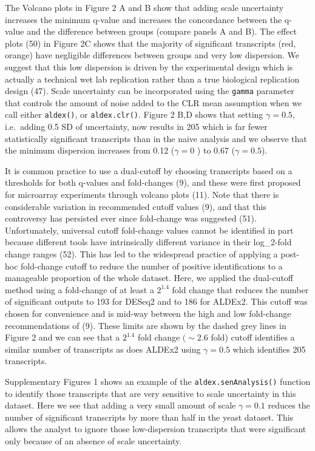 \documentclass[
]{article}
\begin{document}
The Volcano plots in Figure 2 A and B show that adding scale uncertainty
increases the minimum q-value and increases the concordance between the
q-value and the difference between groups (compare panels A and B). The
effect plots (50) in Figure 2C shows that the majority of significant
transcripts (red, orange) have negligible differences between groups and
very low dispersion. We suggest that this low dispersion is driven by
the experimental design which is actually a technical wet lab
replication rather than a true biological replication design (47). Scale
uncertainty can be incorporated using the \texttt{gamma} parameter that
controls the amount of noise added to the CLR mean assumption when we
call either \texttt{aldex()}, or \texttt{aldex.clr()}. Figure 2 B,D
shows that setting \(\gamma=0.5\), i.e.~adding 0.5 SD of uncertainty,
now results in 205 which is far fewer statistically significant
transcripts than in the naive analysis and we observe that the minimum
dispersion increases from 0.12 (\(\gamma = 0\) ) to 0.67
(\(\gamma=0.5\)).

It is common practice to use a dual-cutoff by choosing transcripts based
on a thresholds for both q-values and fold-changes (9), and these were
first proposed for microarray experiments through volcano plots (11).
Note that there is considerable variation in recommended cutoff values
(9), and that this controversy has persisted ever since fold-change was
suggested (51). Unfortunately, universal cutoff fold-change values
cannot be identified in part because different tools have intrinsically
different variance in their log\_2-fold change ranges (52). This has led
to the widespread practice of applying a post-hoc fold-change cutoff to
reduce the number of positive identifications to a manageable proportion
of the whole dataset. Here, we applied the dual-cutoff method using a
fold-change of at least a \(2^{1.4}\) fold change that reduces the
number of significant outputs to 193 for DESeq2 and to 186 for ALDEx2.
This cutoff was chosen for convenience and is mid-way between the high
and low fold-change recommendations of (9). These limits are shown by
the dashed grey lines in Figure 2 and we can see that a \(2^{1.4}\) fold
change \((\sim 2.6\) fold) cutoff identifies a similar number of
transcripts as does ALDEx2 using \(\gamma = 0.5\) which identifies 205
transcripts.

Supplementary Figures 1 shows an example of the
\texttt{aldex.senAnalysis()} function to identify those transcripts that
are very sensitive to scale uncertainty in this dataset. Here we see
that adding a very small amount of scale \(\gamma = 0.1\) reduces the
number of significant transcripts by more than half in the yeast
dataset. This allows the analyst to ignore those low-dispersion
transcripts that were significant only because of an absence of scale
uncertainty.
\end{document}
